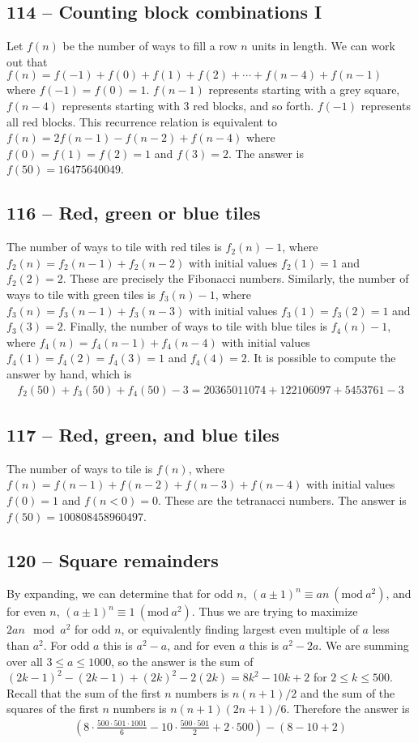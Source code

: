 \documentclass{article}
\newcommand{\Mod}[1]{\ (\mathrm{mod}\ #1)}
\begin{document}
\subsection*{114 -- Counting block combinations I} 
Let $f(n)$ be the number of ways to fill a row $n$ units in length. 
We can work out that $f(n) = f(-1) + f(0) + f(1) + f(2) + \cdots + f(n-4) + f(n-1)$ where $f(-1) = f(0) = 1$. 
$f(n-1)$ represents starting with a grey square, $f(n-4)$ represents starting with 3 red blocks, and so forth.
$f(-1)$ represents all red blocks. 
This recurrence relation is equivalent to $f(n) = 2f(n-1) - f(n-2) + f(n-4)$ where $f(0) = f(1) = f(2) = 1$ and $f(3) = 2$. 
The answer is $f(50) = \boxed{16475640049}$.


\subsection*{116 -- Red, green or blue tiles} 
The number of ways to tile with red tiles is $f_2(n)-1$, where $f_2(n) = f_2(n-1) + f_2(n-2)$ with initial values $f_2(1) = 1$ and $f_2(2) = 2$. 
These are precisely the Fibonacci numbers. 
Similarly, the number of ways to tile with green tiles is $f_3(n)-1$, where $f_3(n) = f_3(n-1) + f_3(n-3)$ with initial values $f_3(1) = f_3(2) = 1$ and $f_3(3) = 2$.  
Finally, the number of ways to tile with blue tiles is $f_4(n)-1$, where $f_4(n) = f_4(n-1) + f_4(n-4)$ with initial values $f_4(1) = f_4(2) = f_4(3) = 1$ and $f_4(4) = 2$. 
It is possible to compute the answer by hand, which is
\begin{align*}
	f_2(50) + f_3(50) + f_4(50) - 3 = \boxed{20365011074 + 122106097 + 5453761 - 3}
\end{align*}


\subsection*{117 -- Red, green, and blue tiles} 
The number of ways to tile is $f(n)$, where $f(n) = f(n-1) + f(n-2) + f(n-3) + f(n-4)$ with initial values $f(0) = 1$ and $f(n<0) = 0$. 
These are the tetranacci numbers. 
The answer is $f(50) = \boxed{100808458960497}$.


\subsection*{120 -- Square remainders} 
By expanding, we can determine that for odd $n$, $(a \pm 1)^n \equiv an \Mod{a^2}$, and for even $n$, $(a \pm 1)^n \equiv 1 \Mod{a^2}$. 
Thus we are trying to maximize $2an \mod a^2$ for odd $n$, or equivalently finding largest even multiple of $a$ less than $a^2$. 
For odd $a$ this is $a^2 - a$, and for even $a$ this is $a^2 - 2a$. 
We are summing over all $3 \leq a \leq 1000$, so the answer is the sum of $(2k-1)^2 - (2k-1) + (2k)^2 - 2(2k) = 8k^2 - 10k + 2$ for $2 \leq k \leq 500$. 
Recall that the sum of the first $n$ numbers is $n(n+1)/2$ and the sum of the squares of the first $n$ numbers is $n(n+1)(2n+1)/6$. 
Therefore the answer is
\begin{align*}
	\boxed{ \left(8\cdot\frac{500\cdot501\cdot1001}{6} - 10\cdot\frac{500\cdot501}{2} + 2\cdot500\right) - (8-10+2) }
\end{align*}
\end{document}
